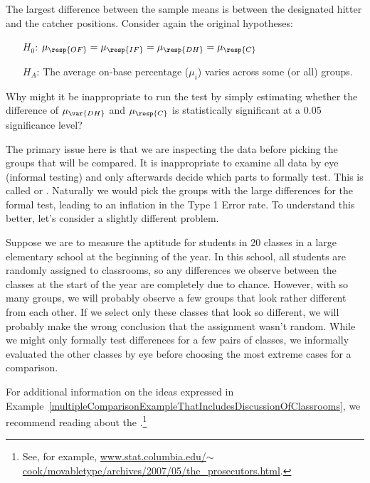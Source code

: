 \begin{example}{The largest difference between the sample means is between the designated hitter and the catcher positions. Consider again the original hypotheses:
\begin{itemize}
\setlength{\itemsep}{0mm}
\item[$H_0$:] $\mu_{\resp{OF}} = \mu_{\resp{IF}} = \mu_{\resp{DH}} = \mu_{\resp{C}}$
\item[$H_A$:] The average on-base percentage ($\mu_i$) varies across some (or all) groups.
\end{itemize}
Why might it be inappropriate to run the test by simply estimating whether the difference of $\mu_{\var{DH}}$ and $\mu_{\resp{C}}$ is statistically significant at a 0.05 significance level?}
\label{multipleComparisonExampleThatIncludesDiscussionOfClassrooms}
The primary issue here is that we are inspecting the data before picking the groups that will be compared. It is inappropriate to examine all data by eye (informal testing) and only afterwards decide which parts to formally test. This is called  or . Naturally we would pick the groups with the large differences for the formal test, leading to an inflation in the Type 1 Error rate. To understand this better, let's consider a slightly different problem.

Suppose we are to measure the aptitude for students in 20 classes in a large elementary school at the beginning of the year. In this school, all students are randomly assigned to classrooms, so any differences we observe between the classes at the start of the year are completely due to chance. However, with so many groups, we will probably observe a few groups that look rather different from each other. If we select only these classes that look so different, we will probably make the wrong conclusion that the assignment wasn't random. While we might only formally test differences for a few pairs of classes, we informally evaluated the other classes by eye before choosing the most extreme cases for a comparison.
\end{example}

For additional information on the ideas expressed in Example~\ref{multipleComparisonExampleThatIncludesDiscussionOfClassrooms}, we recommend reading about the .\footnote{See, for example, \href{http://www.stat.columbia.edu/~cook/movabletype/archives/2007/05/the_prosecutors.html}{www.stat.columbia.edu/$\sim$cook/movabletype/archives/2007/05/the\_prosecutors.html}.}

